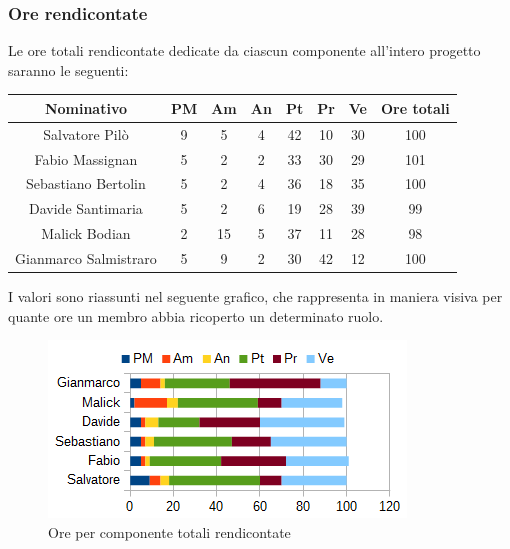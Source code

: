 		\subsubsection{Ore rendicontate}
		Le ore totali rendicontate dedicate da ciascun componente all'intero progetto saranno le seguenti: \\
		\begin{table}[H]
		\centering
		\begin{tabular}{|c|c|c|c|c|c|c|c|}
			\hline
			\textbf{Nominativo}		& \textbf{PM}	& \textbf{Am}	& \textbf{An}	& \textbf{Pt}	& \textbf{Pr}	& \textbf{Ve}	& \textbf{Ore totali}     \\
			\hline
			Salvatore Pilò			& 9		& 5		& 4		& 42	& 10	& 30	& 100 \\
			Fabio Massignan			& 5		& 2		& 2		& 33	& 30	& 29	& 101 \\
			Sebastiano Bertolin		& 5		& 2		& 4		& 36	& 18	& 35	& 100 \\
			Davide Santimaria		& 5		& 2		& 6		& 19	& 28	& 39	& 99 \\
			Malick Bodian			& 2		& 15	& 5		& 37	& 11	& 28	& 98 \\
			Gianmarco Salmistraro	& 5		& 9		& 2		& 30	& 42	& 12	& 100 \\
			\hline
		\end{tabular}
		\end{table}
		I valori sono riassunti nel seguente grafico, che rappresenta in maniera visiva per quante ore un membro abbia ricoperto un determinato ruolo. \\
		\begin{figure}[H]
			\centering
			\includegraphics[scale=1]{immagini/grafici/orario_rendicontato-barra.png}
			\caption{Ore per componente totali rendicontate}
		\end{figure}